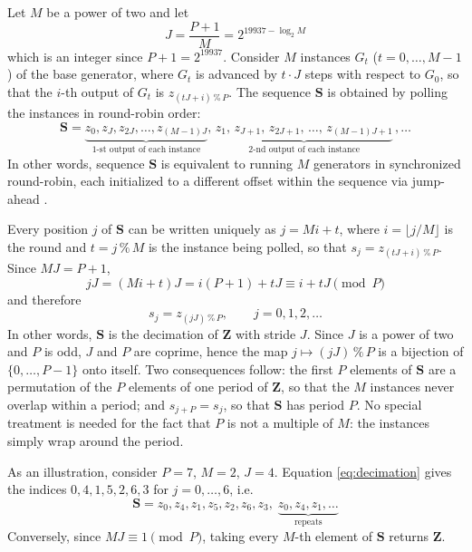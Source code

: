 \documentclass[preprint,1p,times]{elsarticle}
\begin{document}
Let $M$ be a power of two and let
\begin{equation}
\label{eq:jdef}
    J = \frac{P+1}{M} = 2^{19937-\log_2 M}
\end{equation}
which is an integer since $P+1 = 2^{19937}$. Consider $M$ instances $G_t$ ($t=0,\dots,M-1$) of the base generator, where $G_t$ is advanced by $t \cdot J$ steps with respect to $G_0$, so that the $i$-th output of $G_t$ is $z_{(tJ+i)\,\%\,P}$. The sequence $\boldsymbol{S}$ is obtained by polling the instances in round-robin order:
\begin{equation}
\label{eq:combseq}
   \boldsymbol{S}=\underbrace{z_0, z_J, z_{2J}, \dots, z_{(M-1)J}}_{\text{1-st output of each instance}}, \,\underbrace{z_1,\, z_{J+1}, \, z_{2J+1},\, \dots,\, z_{(M-1)J+1}}_{\text{2-nd output of each instance}}\,, \dots
\end{equation}
In other words, sequence $\boldsymbol{S}$ is equivalent to running $M$ generators in synchronized round-robin, each initialized to a different offset within the sequence via jump-ahead \cite{multistream}.

Every position $j$ of $\boldsymbol{S}$ can be written uniquely as $j = Mi + t$, where $i = \lfloor j/M \rfloor$ is the round and $t = j\,\%\,M$ is the instance being polled, so that $s_j = z_{(tJ+i)\,\%\,P}$. Since $MJ = P+1$,
$$ jJ = (Mi+t)J = i(P+1) + tJ \equiv i + tJ \pmod P $$
and therefore
\begin{equation}
\label{eq:decimation}
    s_j = z_{(jJ)\,\%\,P}, \qquad j = 0, 1, 2, \dots
\end{equation}
In other words, $\boldsymbol{S}$ is the decimation of $\boldsymbol{Z}$ with stride $J$. Since $J$ is a power of two and $P$ is odd, $J$ and $P$ are coprime, hence the map $j \mapsto (jJ)\,\%\,P$ is a bijection of $\{0,\dots,P-1\}$ onto itself. Two consequences follow: the first $P$ elements of $\boldsymbol{S}$ are a permutation of the $P$ elements of one period of $\boldsymbol{Z}$, so that the $M$ instances never overlap within a period; and $s_{j+P} = s_j$, so that $\boldsymbol{S}$ has period $P$. No special treatment is needed for the fact that $P$ is not a multiple of $M$: the instances simply wrap around the period.

As an illustration, consider $P=7$, $M=2$, $J=4$. Equation \eqref{eq:decimation} gives the indices $0, 4, 1, 5, 2, 6, 3$ for $j=0,\dots,6$, i.e.
$$\boldsymbol{S} = z_0, z_4, z_1, z_5, z_2, z_6, z_3,\; \underbrace{z_0, z_4, z_1, \ldots}_{\text{repeats}}$$
Conversely, since $MJ \equiv 1 \pmod P$, taking every $M$-th element of $\boldsymbol{S}$ returns $\boldsymbol{Z}$.
\end{document}
